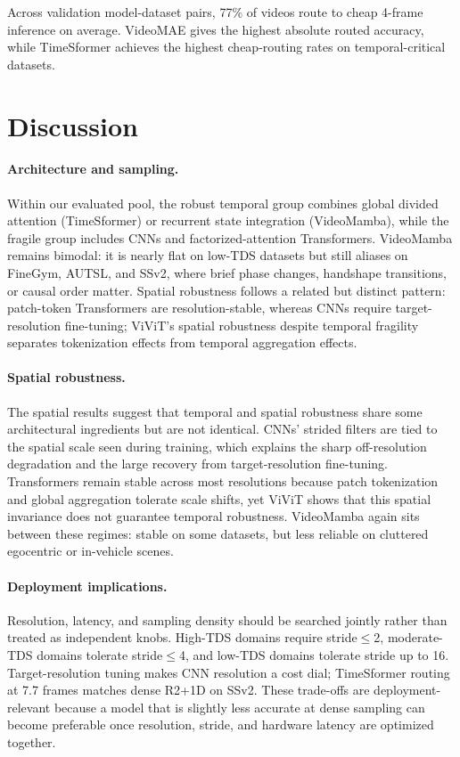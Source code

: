 \documentclass[runningheads]{llncs}
\newcommand{\TDS}{\textsc{TDS}}
\begin{document}
Across validation model-dataset pairs, 77\% of videos route to cheap 4-frame inference on average. VideoMAE gives the highest absolute routed accuracy, while TimeSformer achieves the highest cheap-routing rates on temporal-critical datasets.

\section{Discussion}
\label{sec:discussion}

\paragraph{Architecture and sampling.}
Within our evaluated pool, the robust temporal group combines global divided attention (TimeSformer) or recurrent state integration (VideoMamba), while the fragile group includes CNNs and factorized-attention Transformers. VideoMamba remains bimodal: it is nearly flat on low-\TDS{} datasets but still aliases on FineGym, AUTSL, and SSv2, where brief phase changes, handshape transitions, or causal order matter. Spatial robustness follows a related but distinct pattern: patch-token Transformers are resolution-stable, whereas CNNs require target-resolution fine-tuning; ViViT's spatial robustness despite temporal fragility separates tokenization effects from temporal aggregation effects.

\paragraph{Spatial robustness.}
The spatial results suggest that temporal and spatial robustness share some architectural ingredients but are not identical. CNNs' strided filters are tied to the spatial scale seen during training, which explains the sharp off-resolution degradation and the large recovery from target-resolution fine-tuning. Transformers remain stable across most resolutions because patch tokenization and global aggregation tolerate scale shifts, yet ViViT shows that this spatial invariance does not guarantee temporal robustness. VideoMamba again sits between these regimes: stable on some datasets, but less reliable on cluttered egocentric or in-vehicle scenes.

\paragraph{Deployment implications.}
Resolution, latency, and sampling density should be searched jointly rather than treated as independent knobs. High-\TDS{} domains require stride$\leq$2, moderate-\TDS{} domains tolerate stride$\leq$4, and low-\TDS{} domains tolerate stride up to 16. Target-resolution tuning makes CNN resolution a cost dial; TimeSformer routing at 7.7 frames matches dense R2+1D on SSv2. These trade-offs are deployment-relevant because a model that is slightly less accurate at dense sampling can become preferable once resolution, stride, and hardware latency are optimized together.
\end{document}
